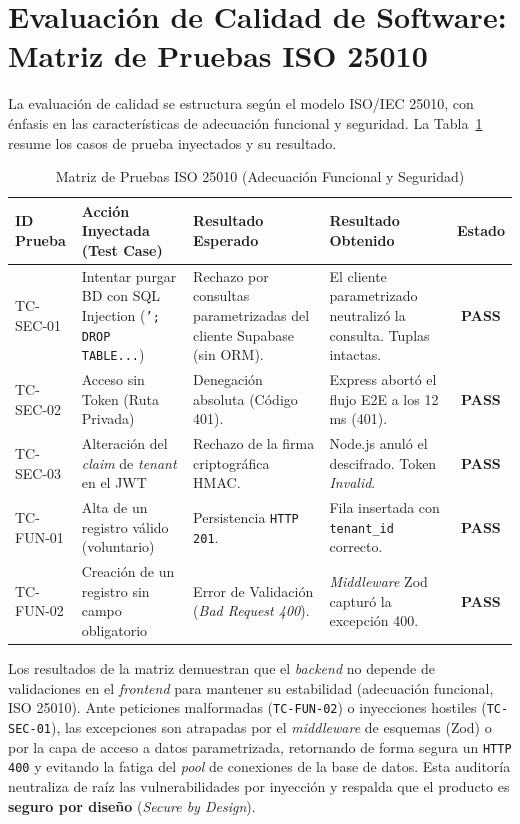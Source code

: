 \section{Evaluaci\'on de Calidad de Software: Matriz de Pruebas ISO 25010}

La evaluaci\'on de calidad se estructura seg\'un el modelo ISO/IEC 25010, con
\'enfasis en las caracter\'isticas de adecuaci\'on funcional y seguridad. La
Tabla~\ref{tab:iso_matrix} resume los casos de prueba inyectados y su resultado.

\begin{table}[htpb]
\centering
\caption{Matriz de Pruebas ISO 25010 (Adecuaci\'on Funcional y Seguridad)}
\label{tab:iso_matrix}
\vspace{2mm}
\begin{tabular}{@{}lp{3cm}p{3cm}p{3cm}c@{}}
\toprule
\textbf{ID Prueba} & \textbf{Acci\'on Inyectada (Test Case)} & \textbf{Resultado Esperado} & \textbf{Resultado Obtenido} & \textbf{Estado} \\
\midrule
TC-SEC-01 & Intentar purgar BD con SQL Injection (\texttt{'; DROP TABLE...}) & Rechazo por consultas parametrizadas del cliente Supabase (sin ORM). & El cliente parametrizado neutraliz\'o la consulta. Tuplas intactas. & \textbf{PASS} \\
TC-SEC-02 & Acceso sin Token (Ruta Privada) & Denegaci\'on absoluta (C\'odigo 401). & Express abort\'o el flujo E2E a los 12 ms (401). & \textbf{PASS} \\
TC-SEC-03 & Alteraci\'on del \textit{claim} de \textit{tenant} en el JWT & Rechazo de la firma criptogr\'afica HMAC. & Node.js anul\'o el descifrado. Token \textit{Invalid}. & \textbf{PASS} \\
TC-FUN-01 & Alta de un registro v\'alido (voluntario) & Persistencia \texttt{HTTP 201}. & Fila insertada con \texttt{tenant\_id} correcto. & \textbf{PASS} \\
TC-FUN-02 & Creaci\'on de un registro sin campo obligatorio & Error de Validaci\'on (\textit{Bad Request 400}). & \textit{Middleware} Zod captur\'o la excepci\'on 400. & \textbf{PASS} \\
\bottomrule
\end{tabular}
\end{table}

Los resultados de la matriz demuestran que el \textit{backend} no depende de
validaciones en el \textit{frontend} para mantener su estabilidad (adecuaci\'on
funcional, ISO 25010). Ante peticiones malformadas (\texttt{TC-FUN-02}) o inyecciones
hostiles (\texttt{TC-SEC-01}), las excepciones son atrapadas por el \textit{middleware}
de esquemas (Zod) o por la capa de acceso a datos parametrizada, retornando de forma
segura un \texttt{HTTP 400} y evitando la fatiga del \textit{pool} de conexiones de la
base de datos. Esta auditor\'ia neutraliza de ra\'iz las vulnerabilidades por
inyecci\'on y respalda que el producto es \textbf{seguro por dise\~no} (\textit{Secure
by Design}).
